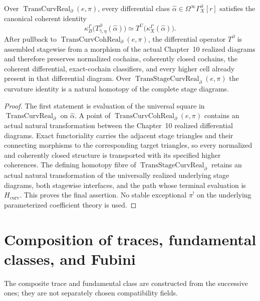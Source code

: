 \begin{theorem}
\label{thm:prequantum-transgression-curvature-compatibility}
Over $\operatorname{TransCurvReal}_{\partial}(e,\pi)$, every differential class
$\widehat\alpha\in\Omega^\infty\Gamma_X^{\partial}[r]$ satisfies the canonical
coherent identity
\[
\boxed{
\kappa_B^{\Gamma}
\bigl(T^{\partial}_{\widehat\gamma,\eta}(\widehat\alpha)\bigr)
\simeq
T^U\bigl(\kappa_X^{\Gamma}(\widehat\alpha)\bigr).
}
\]
After pullback to
$\operatorname{TransCurvCohReal}_{\partial}(e,\pi)$, the
differential operator $T^{\partial}$ is assembled stagewise from a morphism of
the actual Chapter~10 realized diagrams and therefore preserves normalized
cochains, coherently closed cochains, the coherent differential, exact-cochain
classifiers, and every higher cell already present in that differential diagram.
Over $\operatorname{TransStageCurvReal}_{\partial}(e,\pi)$ the curvature
identity is a natural homotopy of the complete stage diagrams.
\end{theorem}

\begin{proof}
The first statement is evaluation of the universal square in
$\operatorname{TransCurvReal}_{\partial}$ on $\widehat\alpha$.  A point of
$\operatorname{TransCurvCohReal}_{\partial}(e,\pi)$ contains an actual natural transformation
between the Chapter~10 realized differential diagrams.  Exact functoriality
carries the adjacent stage triangles and their connecting morphisms to the
corresponding target triangles, so every normalized and coherently closed
structure is transported with its specified higher coherences.  The defining
homotopy fibre of $\operatorname{TransStageCurvReal}_{\partial}$ retains an
actual natural transformation of the universally realized underlying stage diagrams, both
stagewise interfaces, and the path whose terminal evaluation is
$H_{\mathrm{curv}}$.  This proves the final assertion.  No stable
exceptional $\pi^!$ on the underlying parameterized coefficient theory is used.
\end{proof}

\section{Composition of traces, fundamental classes, and Fubini}
\label{sec:prequantum-iterated-transgression-flags}

The composite trace and fundamental class are constructed from the successive
ones; they are not separately chosen compatibility fields.

